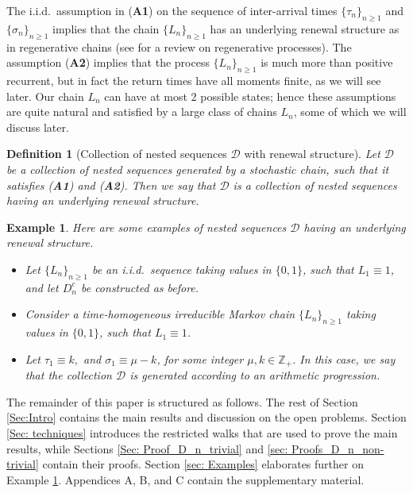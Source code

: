 \documentclass{article}
\numberwithin{equation}{section}
\newtheorem{example}[theorem]{Example}
\newtheorem{defi}[theorem]{Definition}
\newcommand{\DD}{\mbox{${\mathcal D}$}}
\newcommand{\Z}{\mbox{${\mathbb Z}$}}
\newcommand{\1}{\mathbf{1}}
\newcommand{\0}{\mathbf{0}}
\begin{document}
The i.i.d.\ assumption in (\textbf{A1}) on the sequence of inter-arrival times $\{\tau_n\}_{n \ge 1}$ and $\{\sigma_n\}_{n \ge 1}$ implies that the chain $\{L_n\}_{n \ge 1}$ has an underlying renewal structure as in regenerative chains (see \cite{Si_Wo_93} for a review on regenerative processes). The assumption (\textbf{A2}) implies that the process $\{L_n\}_{n \ge 1}$ is much more than positive recurrent, but in fact the return times have all moments finite, as we will see later. Our chain $L_n$ can have at most $2$ possible states; hence these assumptions are quite natural and satisfied by a large class of chains $L_n$, some of which we will discuss later.


\begin{defi}[Collection of nested sequences $\DD$ with renewal structure]
Let $\DD$ be a collection of nested sequences generated by a stochastic chain, such that it satisfies (\textbf{A1}) and (\textbf{A2}). Then we say that $\DD$ is a collection of nested sequences having an underlying renewal structure.
\end{defi}


\begin{example}
\label{Def: examples}
Here are some examples of nested sequences $\DD$ having an underlying renewal structure.  
\begin{itemize}
\item Let $\{L_n\}_{n \ge 1}$ be an i.i.d.\ sequence taking values in $\{0, 1\}$, such that $L_1 \equiv 1$, and let $D_n^c$ be constructed as before.

\item Consider a time-homogeneous irreducible Markov chain $\{L_n\}_{n \ge 1}$ taking values in $\{0, 1\}$, such that $L_1 \equiv 1$. 

\item Let $\tau_{1}\equiv k,$ and $\sigma_{1}\equiv \mu-k$, for some integer $\mu, k \in \Z_{+}$. In this case, we say that the collection $\DD$ is generated according to an arithmetic progression. 


\end{itemize}
\end{example}

The remainder of this paper is structured as follows. The rest of Section \ref{Sec:Intro} contains the main results and discussion on the open problems. Section \ref{Sec: techniques} introduces the restricted walks that are used to prove the main results, while Sections \ref{Sec: Proof_D_n_trivial} and \ref{sec: Proofs_D_n_non-trivial} contain their proofs. Section \ref{sec: Examples} elaborates further on Example \ref{Def: examples}. Appendices A, B, and C contain the supplementary material. 
\end{document}
